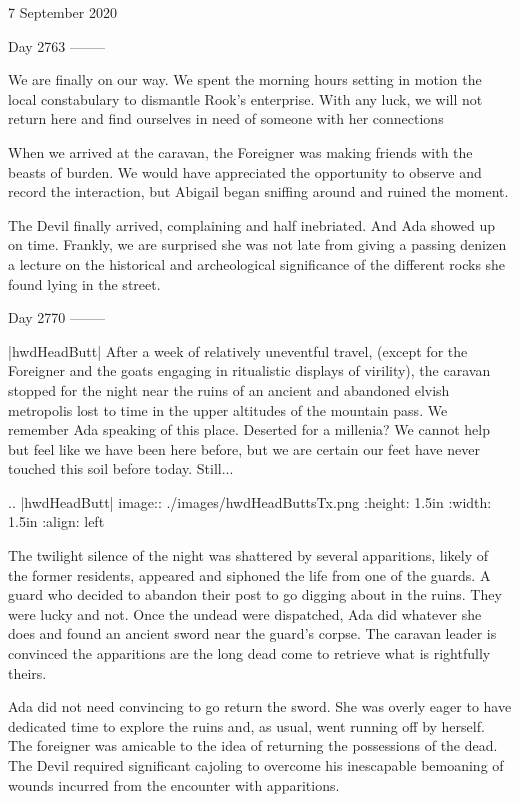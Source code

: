 7 September 2020

Day 2763
--------

We are finally on our way.  We spent the morning hours setting in motion the local constabulary to dismantle Rook’s enterprise.  With any luck, we will not return here and find ourselves in need of someone with her connections

When we arrived at the caravan, the Foreigner was making friends with the beasts of burden.  We would have appreciated the opportunity to observe and record the interaction, but Abigail began sniffing around and ruined the moment.

The Devil finally arrived, complaining and half inebriated.  And Ada showed up on time.  Frankly, we are surprised she was not late from giving a passing denizen a lecture on the historical and archeological significance of the different rocks she found lying in the street.


Day 2770
--------

|hwdHeadButt| After a week of relatively uneventful travel, (except for the Foreigner and the goats engaging in ritualistic displays of virility), the caravan stopped for the night near the ruins of an ancient and abandoned elvish metropolis lost to time in the upper altitudes of the mountain pass.  We remember Ada speaking of this place.  Deserted for a millenia?  We cannot help but feel like we have been here before, but we are certain our feet have never touched this soil before today.  Still...

.. |hwdHeadButt| image:: ./images/hwdHeadButtsTx.png
  :height: 1.5in
  :width: 1.5in
  :align: left

The twilight silence of the night was shattered by several apparitions, likely of the former residents, appeared and siphoned the life from one of the guards.  A guard who decided to abandon their post to go digging about in the ruins.  They were lucky and not.  Once the undead were dispatched, Ada did whatever she does and found an ancient sword near the guard’s corpse.  The caravan leader is convinced the apparitions are the long dead come to retrieve what is rightfully theirs.

Ada did not need convincing to go return the sword.  She was overly eager to have dedicated time to explore the ruins and, as usual, went running off by herself.  The foreigner was amicable to the idea of returning the possessions of the dead.  The Devil required significant cajoling to overcome his inescapable bemoaning of wounds incurred from the encounter with apparitions.

